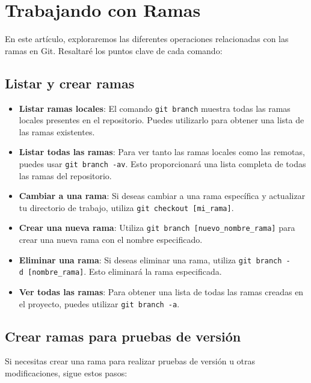 \documentclass[
  a4paper,
]{article}
\begin{document}
\section{Trabajando con Ramas}\label{trabajando-con-ramas}

En este artículo, exploraremos las diferentes operaciones relacionadas
con las ramas en Git. Resaltaré los puntos clave de cada comando:

\subsection{Listar y crear ramas}\label{listar-y-crear-ramas}

\begin{itemize}
\item
  \textbf{Listar ramas locales}: El comando \texttt{git\ branch} muestra
  todas las ramas locales presentes en el repositorio. Puedes utilizarlo
  para obtener una lista de las ramas existentes.
\item
  \textbf{Listar todas las ramas}: Para ver tanto las ramas locales como
  las remotas, puedes usar \texttt{git\ branch\ -av}. Esto proporcionará
  una lista completa de todas las ramas del repositorio.
\item
  \textbf{Cambiar a una rama}: Si deseas cambiar a una rama específica y
  actualizar tu directorio de trabajo, utiliza
  \texttt{git\ checkout\ {[}mi\_rama{]}}.
\item
  \textbf{Crear una nueva rama}: Utiliza
  \texttt{git\ branch\ {[}nuevo\_nombre\_rama{]}} para crear una nueva
  rama con el nombre especificado.
\item
  \textbf{Eliminar una rama}: Si deseas eliminar una rama, utiliza
  \texttt{git\ branch\ -d\ {[}nombre\_rama{]}}. Esto eliminará la rama
  especificada.
\item
  \textbf{Ver todas las ramas}: Para obtener una lista de todas las
  ramas creadas en el proyecto, puedes utilizar
  \texttt{git\ branch\ -a}.
\end{itemize}

\subsection{Crear ramas para pruebas de
versión}\label{crear-ramas-para-pruebas-de-versiuxf3n}

Si necesitas crear una rama para realizar pruebas de versión u otras
modificaciones, sigue estos pasos:
\end{document}

